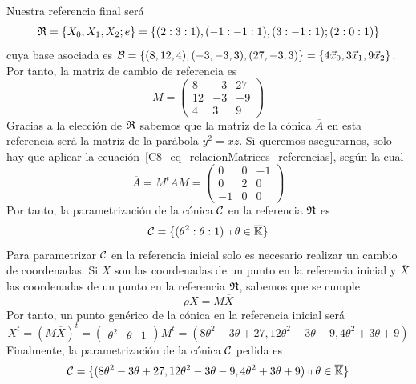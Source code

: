 \begin{exa}
	Nuestra referencia final será
	\[\mathfrak{R}=\{X_0,X_1,X_2;e\}=\{(2:3:1),(-1:-1:1),(3:-1:1);(2:0:1)\}\]
	cuya base asociada es $\mathcal{B}=\{(8,12,4),(-3,-3,3),(27,-3,3)\}=\{4\vec{x}_0,3\vec{x}_1,9\vec{x}_2\}$. Por tanto, la matriz de cambio de referencia es
	\begin{equation*}
		M=\left( \begin{array}{ccc}
			8&-3&27\\
			12&-3 &-9\\
			4&3&9
		\end{array}\right) 
	\end{equation*}
	Gracias a la elección de $\mathfrak{R}$ sabemos que la matriz de la cónica $\overline{A}$ en esta referencia será la matriz de la parábola $y^2=xz$. Si queremos asegurarnos, solo hay que aplicar la ecuación~\eqref{C8_eq_relacionMatrices_referencias}, según la cual
	\begin{equation*}
		\overline{A}=M^tAM=
		\left( \begin{array}{ccc}
		0 & 0 & -1\\
		0 & 2 & 0\\
		-1 & 0 & 0
		\end{array}\right)
	\end{equation*}
	Por tanto, la parametrización de la cónica $\mathcal{C}$ en la referencia $\mathfrak{R}$ es 
	\begin{equation*}
	 \mathcal{C}=\{(\theta^2:\theta:1)\shortparallel \theta\in\overline{\mathbb{K}}\}
	\end{equation*}
	Para parametrizar $\mathcal{C}$ en la referencia inicial solo es necesario realizar un cambio de coordenadas. Si $X$ son las coordenadas de un punto en la referencia inicial y $\overline{X}$ las coordenadas de un punto en la referencia $\mathfrak{R}$, sabemos que se cumple
	\begin{equation*}
		\rho X=M\overline{X}
	\end{equation*}
	Por tanto, un punto genérico de la cónica en la referencia inicial será
	\begin{equation}
		X^t=(M\overline{X})^t=
		\begin{pmatrix}
		\theta^2 & \theta & 1
		\end{pmatrix}M^t=(8\theta^2-3\theta+27,12\theta^2-3\theta-9,4\theta^2+3\theta+9)
	\end{equation}
	Finalmente, la parametrización de la cónica $\mathcal{C}$ pedida es
	\begin{equation*}
		\mathcal{C}=\{(8\theta^2-3\theta+27,12\theta^2-3\theta-9,4\theta^2+3\theta+9)\shortparallel \theta\in\overline{\mathbb{K}}\}
	\end{equation*}
\end{exa}
